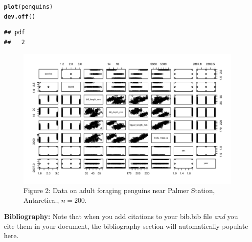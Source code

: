 \documentclass{article}\usepackage[]{graphicx}\usepackage[]{xcolor}
\makeatletter
\newcommand{\hldef}[1]{\textcolor[rgb]{0.345,0.345,0.345}{#1}}%
\newcommand{\hlkwd}[1]{\textcolor[rgb]{0.737,0.353,0.396}{\textbf{#1}}}%
\newenvironment{kframe}{%
 \def\at@end@of@kframe{}%
 \ifinner\ifhmode%
  \def\at@end@of@kframe{\end{minipage}}%
  \begin{minipage}{\columnwidth}%
 \fi\fi%
 \def\FrameCommand##1{\hskip\@totalleftmargin \hskip-\fboxsep
 \colorbox{shadecolor}{##1}\hskip-\fboxsep
     \hskip-\linewidth \hskip-\@totalleftmargin \hskip\columnwidth}%
 \MakeFramed {\advance\hsize-\width
   \@totalleftmargin\z@ \linewidth\hsize
   \@setminipage}}%
 {\par\unskip\endMakeFramed%
 \at@end@of@kframe}
\newenvironment{knitrout}{}{} %
\makeatother
\begin{document}
\begin{multicols}{2}
\begin{knitrout}
\begin{kframe}
\begin{alltt}
\hlkwd{plot}\hldef{(penguins)}
\hlkwd{dev.off}\hldef{()}
\end{alltt}
\begin{verbatim}
## pdf 
##   2
\end{verbatim}
\end{kframe}
\end{knitrout}
\begin{figure}[H]
\begin{center}
\includegraphics[scale=0.8]{figure/penguins.pdf}
\caption{Figure 2: Data on adult foraging penguins near Palmer Station, Antarctica., $n=200$.}
\label{plot3}
\end{center}
\end{figure}

\vspace{2em}

\noindent\textbf{Bibliography:} Note that when you add citations to your bib.bib file \emph{and}
you cite them in your document, the bibliography section will automatically populate here.

\begin{tiny}

\end{tiny}
\end{multicols}
\end{document}

